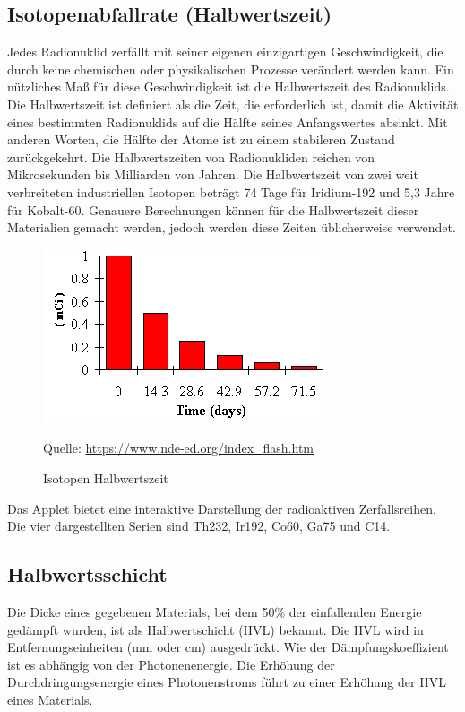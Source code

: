 \subsection{Isotopenabfallrate (Halbwertszeit)}
Jedes Radionuklid zerfällt mit seiner eigenen einzigartigen Geschwindigkeit, die durch keine chemischen oder physikalischen Prozesse verändert werden kann. Ein nützliches Maß für diese Geschwindigkeit ist die Halbwertszeit des Radionuklids. Die Halbwertszeit ist definiert als die Zeit, die erforderlich ist, damit die Aktivität eines bestimmten Radionuklids auf die Hälfte seines Anfangswertes absinkt. Mit anderen Worten, die Hälfte der Atome ist zu einem stabileren Zustand zurückgekehrt. Die Halbwertszeiten von Radionukliden reichen von Mikrosekunden bis Milliarden von Jahren. Die Halbwertszeit von zwei weit verbreiteten industriellen Isotopen beträgt 74 Tage für Iridium-192 und 5,3 Jahre für Kobalt-60. Genauere Berechnungen können für die Halbwertszeit dieser Materialien gemacht werden, jedoch werden diese Zeiten üblicherweise verwendet.
\begin{figure}[htb]
  \centering  
  \includegraphics[scale=0.5]{img/halbwertszeit.png}
  \caption{Isotopen Halbwertszeit}
  \label{fig:halbwertszeit}
   Quelle: \url{https://www.nde-ed.org/index_flash.htm}
\end{figure}

Das Applet bietet eine interaktive Darstellung der radioaktiven Zerfallsreihen.
Die vier dargestellten Serien sind Th232, Ir192, Co60, Ga75 und C14.

\subsection{Halbwertsschicht}
Die Dicke eines gegebenen Materials, bei dem 50\% der einfallenden Energie gedämpft wurden, ist als Halbwertschicht (HVL) bekannt. Die HVL wird in Entfernungseinheiten (mm oder cm) ausgedrückt. Wie der Dämpfungskoeffizient ist es abhängig von der Photonenenergie. Die Erhöhung der Durchdringungsenergie eines Photonenstroms führt zu einer Erhöhung der HVL eines Materials.

